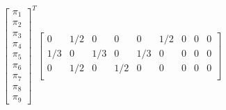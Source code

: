 \begin{equation*}
\begin{bmatrix}
  \pi_1 \\  \pi_2 \\  \pi_3 \\  \pi_4 \\  \pi_5 \\  \pi_6 \\  \pi_7 \\  \pi_8 \\  \pi_9 
\end{bmatrix}^T
\begin{bmatrix}
          0 &    1/2       &   0       &   0      &    0  &   1/2        &  0  &        0       &   0 \\
     1/3    &     0  &  1/3     &    0 &   1/3      &   0&         0        & 0        & 0 \\
          0 &    1/2         & 0   & 1/2       &  0       &  0        & 0        & 0  &       0 \\

\end{bmatrix}
\end{equation*}
